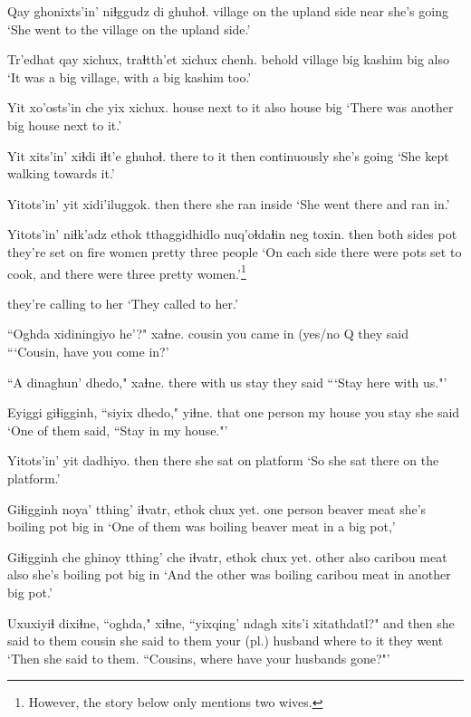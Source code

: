 \documentclass[12pt]{article}
\begin{document}
\gll Qay ghonixts'in' {niɬggudz di} ghuhoɬ.
village {on the upland side}  near {she's going}
\glt `She went to the village on the upland side.'
\glend 

\gll Tr'edhat qay xichux, traɬtth'et xichux chenh.
behold  village big  kashim  big  also
\glt `It was a big village, with a big kashim too.'
\glend 

\gll Yit xo'osts'in che yix xichux.
house {next to it} also house big
\glt `There was another big house next to it.'
\glend 

\gll Yit xits'in' xiɬdi iɬt'e ghuhoɬ.
there {to it} then continuously {she's going}
\glt  `She kept walking towards it.'
\glend 

\gll Yitots'in' yit xidi'iluggok.
then  there {she ran inside}
\glt `She went there and ran in.'
\glend 

\gll Yitots'in' niɬk'adz ethok tthaggidhidlo nuq'oɬdaɬin neg toxin.
then  {both sides} pot {they're set on fire} women  pretty {three people}
\glt `On each side there were pots set to cook, and there were three pretty women.'\footnote{However, the story below only mentions two wives.}
\glend 

{{they're calling to her}}
\glt `They called to her.'
\glend 

\gll ``Oghda xidiningiyo  he'?" xaɬne.
cousin {you came in} {(yes/no Q}  {they said}
\glt ```Cousin, have you come in?'
\glend 

\gll ``A dinaghun' dhedo," xaɬne.
there {with us}  stay  {they said}
\glt ```Stay here with us."'
\glend 

\gll Eyiggi giɬigginh, ``siyix  dhedo," yiɬne.
that  {one person}  {my house} {you stay}  {she said}
\glt `One of them said, ``Stay in my house."'
\glend 

\gll Yitots'in' yit dadhiyo.
then  there {she sat on platform}
\glt `So she sat there on the platform.'
\glend 

\gll Giɬigginh noya' tthing' iɬvatr,  ethok chux yet.
{one person} beaver meat  {she's boiling} pot big in
\glt `One of them was boiling beaver meat in a big pot,'
\glend 

\gll Giɬigginh che ghinoy tthing' che iɬvatr,  ethok chux yet.
other also caribou  meat  also {she's boiling} pot big in
\glt `And the other was boiling caribou meat in another big pot.'
\glend 

\gll Uxuxiyiɬ dixiɬne,  ``oghda," xiɬne, ``yixqing'  ndagh xits'i xitathdatl?"
{and then}  {she said to them} cousin {she said to them} {your (pl.) husband} where {to it} {they went}
\glt `Then she said to them. ``Cousins, where have your husbands gone?"'
\glend 
\end{document}
